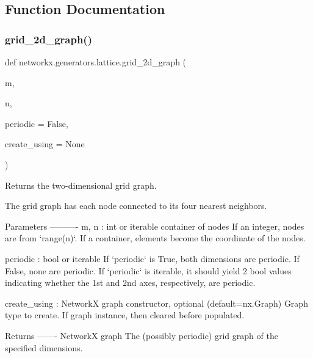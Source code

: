 \subsection{Function Documentation}
\mbox{\label{namespacenetworkx_1_1generators_1_1lattice_a5840a7b13a29e53505d6e5a96e01db2b}} 
\subsubsection{\texorpdfstring{grid\+\_\+2d\+\_\+graph()}{grid\_2d\_graph()}}
{\footnotesize\ttfamily def networkx.\+generators.\+lattice.\+grid\+\_\+2d\+\_\+graph (\begin{DoxyParamCaption}\item[{}]{m,  }\item[{}]{n,  }\item[{}]{periodic = {\ttfamily False},  }\item[{}]{create\+\_\+using = {\ttfamily None} }\end{DoxyParamCaption})}

\begin{DoxyVerb}Returns the two-dimensional grid graph.

The grid graph has each node connected to its four nearest neighbors.

Parameters
----------
m, n : int or iterable container of nodes
    If an integer, nodes are from `range(n)`.
    If a container, elements become the coordinate of the nodes.

periodic : bool or iterable
    If `periodic` is True, both dimensions are periodic. If False, none
    are periodic.  If `periodic` is iterable, it should yield 2 bool
    values indicating whether the 1st and 2nd axes, respectively, are
    periodic.

create_using : NetworkX graph constructor, optional (default=nx.Graph)
    Graph type to create. If graph instance, then cleared before populated.

Returns
-------
NetworkX graph
    The (possibly periodic) grid graph of the specified dimensions.\end{DoxyVerb}
 \mbox{\label{namespacenetworkx_1_1generators_1_1lattice_a2233c49114639acd7739d43b03e64f2c}} 
